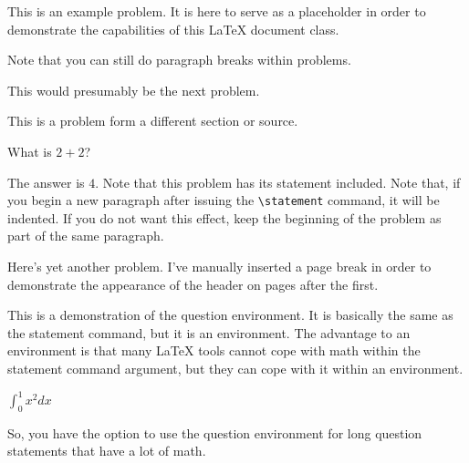 \documentclass{homework}
\begin{document}
\maketitle



\begin{problem}{3}
  This is an example problem. It is here to serve as a placeholder in
  order to demonstrate the capabilities of this \LaTeX{} document
  class.

  Note that you can still do paragraph breaks within problems.
\end{problem}

\begin{problem}{4}
  This would presumably be the next problem.
\end{problem}


\begin{problem}{10}
  This is a problem form a different section or source.
\end{problem}

\begin{problem}{11}
  \begin{question}
    What is $2 + 2$?
  \end{question}
  The answer is $4$. Note that this problem has its statement
  included. Note that, if you begin a new paragraph after issuing the
  \verb+\statement+ command, it will be indented. If you do not want
  this effect, keep the beginning of the problem as part of the same
  paragraph.
\end{problem}

\newpage

\begin{problem}{17}
  Here's yet another problem. I've manually inserted a page break in
  order to demonstrate the appearance of the header on pages after the
  first.
\end{problem}

\begin{problem}{25}
  \begin{question}
    This is a demonstration of the question environment.  It is basically the
    same as the statement command, but it is an environment.  The advantage to
    an environment is that many LaTeX tools cannot cope with math within the
    statement command argument, but they can cope with it within an environment.

    $\int_0^1 x^2 dx$

  \end{question}

  So, you have the option to use the question environment for long question
  statements that have a lot of math.
\end{problem}
\end{document}
